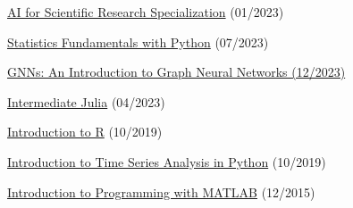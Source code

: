 \begin{cventries}
{\begin{cvitems}
            \item{\href{https://www.coursera.org/account/accomplishments/specialization/XU23J53N3SAW}{AI for Scientific Research Specialization} (01/2023)}
            \item{\href{https://www.datacamp.com/completed/statement-of-accomplishment/track/f6b840f135825806cde25b622730d804b8e9b987}{Statistics Fundamentals with Python} (07/2023)}
            \item{\href{https://skillsoft.digitalbadges.skillsoft.com/30851258-8ee5-4f58-86ba-9a0e152c8434#gs.1s8e65}{GNNs: An Introduction to Graph Neural Networks (12/2023)}}
            \item{\href{https://www.datacamp.com/statement-of-accomplishment/course/930a810eaf9c88d856429bfabf33cb9df57e2046}{Intermediate Julia} (04/2023)}
            \item{\href{https://www.datacamp.com/statement-of-accomplishment/course/dd5746b9564cf374bcc0bb379e1801925e25259e}{Introduction to R} (10/2019)}
            \item{\href{https://www.datacamp.com/statement-of-accomplishment/course/807548ea866063da3c0083afcebf3be48d44f277}{Introduction to Time Series Analysis in Python} (10/2019)}
            \item {\href{https://www.coursera.org/account/accomplishments/verify/9G7V69L6QP}{Introduction to Programming with MATLAB} (12/2015)}
        \end{cvitems}      
    }

\end{cventries}
